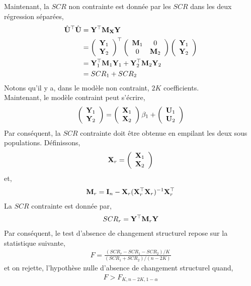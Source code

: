 Maintenant, la $SCR$ non contrainte est donnée par les $SCR$ dans les deux régression séparées,
\begin{align*}
\hat{\mathbf U}^\top\hat{\mathbf U} &= \mathbf Y^\top\mathbf M_\mathbf X\mathbf Y\\
&=
\left(
\begin{array}{c}
\mathbf Y_1\\
\mathbf Y_2
\end{array}
\right)^\top
\left(
\begin{array}{cc}
\mathbf M_1&0\\
0&\mathbf M_2
\end{array}
\right)
\left(
\begin{array}{c}
\mathbf Y_1\\
\mathbf Y_2
\end{array}
\right)
\\
&= \mathbf Y_1^\top\mathbf M_1\mathbf Y_1 + \mathbf Y_2^\top\mathbf M_2\mathbf Y_2\\
&=SCR_1 +SCR_2
\end{align*}
Notons qu'il y a, dans le modèle non contraint, $2K$ coefficients.\\
Maintenant, le modèle contraint peut s'écrire,
\begin{align}
\left(
\begin{array}{c}
\mathbf Y_1\\
\mathbf Y_2
\end{array}
\right)
=
\left(
\begin{array}{c}
\mathbf X_1\\
\mathbf X_2
\end{array}
\right)\beta_1
+
\left(
\begin{array}{c}
\mathbf U_1\\
\mathbf U_2
\end{array}
\right)
\label{eq52}
\end{align}
Par conséquent, la $SCR$ contrainte doit être obtenue en empilant les deux sous populations. Définissons,
\begin{align*}
\mathbf X_r = \left(\begin{array}{c}
\mathbf X_1\\
\mathbf X_2
\end{array}\right)
\end{align*}
et,
\begin{align*}
\mathbf M_r = \mathbf{I}_n - \mathbf X_r(\mathbf X_r^\top\mathbf X_r)^{-1}\mathbf X_r^\top
\end{align*}
La $SCR$ contrainte est donnée par,
\begin{align*}
SCR_r = \mathbf Y^\top\mathbf M_r\mathbf Y
\end{align*}
Par conséquent, le test d'absence de changement structurel repose sur la statistique suivante,
\begin{align*}
F = \frac{(SCR_r - SCR_1 - SCR_2)/K}{(SCR_1 + SCR_2)/(n-2K)}
\end{align*}
et on rejette, l'hypothèse nulle d'absence de changement structurel quand,
\begin{align*}
F > F_{K, n-2K, 1-\alpha}
\end{align*}

